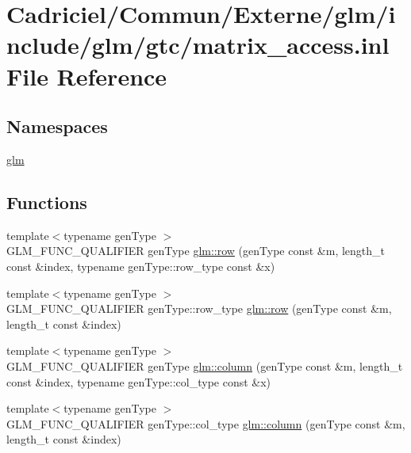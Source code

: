 \hypertarget{matrix__access_8inl}{}\section{Cadriciel/\+Commun/\+Externe/glm/include/glm/gtc/matrix\+\_\+access.inl File Reference}
\label{matrix__access_8inl}
\subsection*{Namespaces}
\begin{DoxyCompactItemize}
\item 
 \hyperlink{namespaceglm}{glm}
\end{DoxyCompactItemize}
\subsection*{Functions}
\begin{DoxyCompactItemize}
\item 
{\footnotesize template$<$typename gen\+Type $>$ }\\G\+L\+M\+\_\+\+F\+U\+N\+C\+\_\+\+Q\+U\+A\+L\+I\+F\+I\+ER gen\+Type \hyperlink{group__gtc__matrix__access_gacb34e8dca9cd0efdd247a65e36ed0a86}{glm\+::row} (gen\+Type const \&m, length\+\_\+t const \&index, typename gen\+Type\+::row\+\_\+type const \&x)
\item 
{\footnotesize template$<$typename gen\+Type $>$ }\\G\+L\+M\+\_\+\+F\+U\+N\+C\+\_\+\+Q\+U\+A\+L\+I\+F\+I\+ER gen\+Type\+::row\+\_\+type \hyperlink{group__gtc__matrix__access_ga5b874831eef18913dbe30153e52a2476}{glm\+::row} (gen\+Type const \&m, length\+\_\+t const \&index)
\item 
{\footnotesize template$<$typename gen\+Type $>$ }\\G\+L\+M\+\_\+\+F\+U\+N\+C\+\_\+\+Q\+U\+A\+L\+I\+F\+I\+ER gen\+Type \hyperlink{group__gtc__matrix__access_gaff0c6f887deb04ce0519084d32aadb85}{glm\+::column} (gen\+Type const \&m, length\+\_\+t const \&index, typename gen\+Type\+::col\+\_\+type const \&x)
\item 
{\footnotesize template$<$typename gen\+Type $>$ }\\G\+L\+M\+\_\+\+F\+U\+N\+C\+\_\+\+Q\+U\+A\+L\+I\+F\+I\+ER gen\+Type\+::col\+\_\+type \hyperlink{group__gtc__matrix__access_ga5c37fbeb062151f930e8a231c37e6b81}{glm\+::column} (gen\+Type const \&m, length\+\_\+t const \&index)
\end{DoxyCompactItemize}


